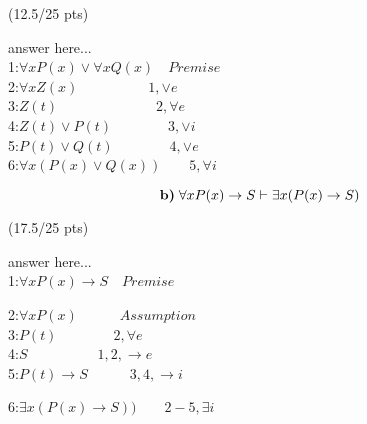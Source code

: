 \documentclass[a4paper,12pt]{article}
\begin{document}
\hfill \small{(12.5/25 pts)}\\
\newpage
\begin{tcolorbox}
answer here...\\

1:$\forall x P(x)\lor \forall x Q(x) \quad Premise$\\
2:$\forall x Z(x) \quad\quad\quad\quad\quad 1,\lor e$\\
3:$Z(t) \quad\quad\quad\quad\quad\quad\quad 2,\forall e$\\
4:$Z(t)\lor P(t) \quad\quad\quad\quad 3,\lor i$\\
5:$P(t)\lor Q(t) \quad\quad\quad\quad 4,\lor e$\\
6:$\forall x(P(x)\lor Q(x)) \quad\quad 5,\forall i$\\
\vspace{1cm} %
\end{tcolorbox}

\begin{equation*}
    \textbf{b)} \; \forall x P(x) \rightarrow S \vdash \exists x (P(x)\rightarrow S)\\
\end{equation*}

\hfill \small{(17.5/25 pts)}\\
\begin{tcolorbox}
answer here...\\
1:$\forall x P(x)\rightarrow S \quad Premise$\\
\begin{tcolorbox}
2:$\forall x P(x) \quad\quad\quad Assumption$\\
3:$P(t)\quad\quad\quad\quad 2,\forall e$\\
4:$S \quad\quad\quad\quad\quad 1,2,\rightarrow e$\\
5:$P(t)\rightarrow S \quad\quad\quad 3,4,\rightarrow i$\\
\end{tcolorbox}
6:$\exists x(P(x)\rightarrow S)) \quad\quad 2-5,\exists i$\\
\vspace{1cm} %
\end{tcolorbox}
\end{document}
